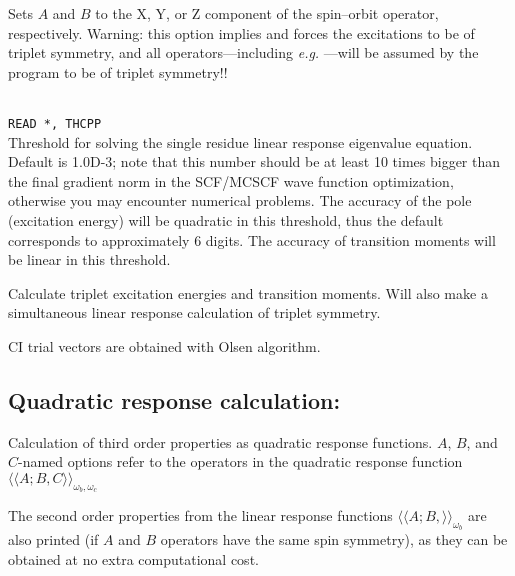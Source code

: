 \begin{description}
\item{}
Sets $A$ and $B$ to the X, Y, or Z component of the spin--orbit
operator, respectively.
Warning: this option implies  and
forces the excitations to be of triplet symmetry,
and all operators---including
{\it e.g.\/} ---will be assumed by the program to be of triplet symmetry!!

\item{}\\
\verb|READ *, THCPP|\\
Threshold for solving the single residue linear response eigenvalue equation.
Default is 1.0D-3; note that this number should be at least 10 times
bigger than the final gradient norm in the SCF/MCSCF
wave function optimization, otherwise you may encounter
numerical problems.
The accuracy of the pole (excitation energy) will be
quadratic in this threshold, thus the default corresponds to approximately
6 digits. The accuracy of transition moments will be linear in this threshold.

\item{} Calculate triplet excitation energies and transition moments.
Will also make a simultaneous linear response calculation of triplet symmetry.

\item{}
CI trial vectors are obtained with Olsen algorithm.

\end{description}

\subsection{Quadratic response calculation: }
\label{sec:quadraticrsp}

Calculation of third order properties
 as quadratic response
functions.
$A$, $B$, and $C$-named options refer to the operators in the quadratic
response function
$\langle\!\langle A;B,C \rangle\!\rangle_{\omega_b,\omega_c}$
\cite{ovhapjhjajthjojcp97,hhhjajpjjojcp97,haovhkpjthjcp98}

The second order properties from the linear response functions
$\langle\!\langle A;B,\rangle\!\rangle_{\omega_b}$ are also printed
(if $A$ and $B$ operators have the same spin symmetry),
as they can be obtained at no extra computational cost.

